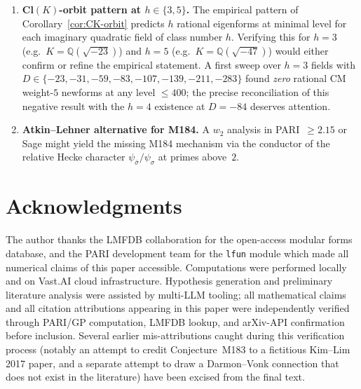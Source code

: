 \documentclass[12pt]{amsart}
\theoremstyle{definition}
\newcommand{\Q}{\mathbb{Q}}
\begin{document}
\begin{enumerate}[leftmargin=2em,label=\textbf{OP\arabic*.}]
        the exact match.
  \item \textbf{Cl$(K)$-orbit pattern at $h \in \{3, 5\}$.} The
        empirical pattern of Corollary~\ref{cor:CK-orbit} predicts
        $h$ rational eigenforms at minimal level for each
        imaginary quadratic field of class number $h$. Verifying
        this for $h = 3$ (e.g.\ $K = \Q(\sqrt{-23})$) and $h = 5$
        (e.g.\ $K = \Q(\sqrt{-47})$) would either confirm or refine
        the empirical statement. A first sweep over $h = 3$ fields
        with $D \in \{-23, -31, -59, -83, -107, -139, -211, -283\}$
        found \emph{zero} rational CM weight-$5$ newforms at any level
        $\le 400$; the precise reconciliation of this negative result
        with the $h = 4$ existence at $D = -84$ deserves attention.
  \item \textbf{Atkin--Lehner alternative for M184.} A $w_2$ analysis
        in PARI~$\geq 2.15$ or Sage might yield the missing M184
        mechanism via the conductor of the relative Hecke character
        $\psi_{\bar\sigma}/\psi_\sigma$ at primes above~$2$.
\end{enumerate}

\section*{Acknowledgments}

The author thanks the LMFDB collaboration for the open-access modular
forms database, and the PARI development team for the \texttt{lfun}
module which made all numerical claims of this paper accessible.
Computations were performed locally and on Vast.AI cloud
infrastructure. Hypothesis generation and preliminary literature
analysis were assisted by multi-LLM tooling;
all mathematical claims and all citation attributions appearing in this
paper were independently verified through PARI/GP computation, LMFDB
lookup, and ar\textsc{X}iv-API confirmation before inclusion. Several
earlier mis-attributions caught during this verification process
(notably an attempt to credit Conjecture~M183 to a fictitious
Kim--Lim 2017 paper, and a separate
attempt to draw a Darmon--Vonk connection that does not exist in the
literature) have been excised from the final text.

\end{document}
